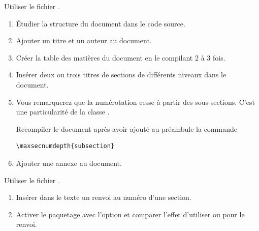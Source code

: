 \begin{exercice}[nosol]
  Utiliser le fichier .
  \begin{enumerate}
  \item Étudier la structure du document dans le code source.
  \item Ajouter un titre et un auteur au document.
  \item Créer la table des matières du document en le compilant 2 à 3
    fois.
  \item Insérer deux ou trois titres de sections de différents niveaux
    dans le document.
  \item Vous remarquerez que la numérotation cesse à partir des
    sous-sections. C'est une particularité de la classe
    .

    Recompiler le document après avoir ajouté au préambule la commande
\begin{lstlisting}
\maxsecnumdepth{subsection}
\end{lstlisting}
  \item Ajouter une annexe au document.
  \end{enumerate}
\end{exercice}

\begin{exercice}[nosol]
  Utiliser le fichier .
  \begin{enumerate}
  \item Insérer dans le texte un renvoi au numéro d'une section.
  \item Activer le paquetage  avec l'option
     et comparer l'effet d'utiliser \cmd{\ref} ou
    \cmd{\autoref} pour le renvoi.
  \end{enumerate}
\end{exercice}


